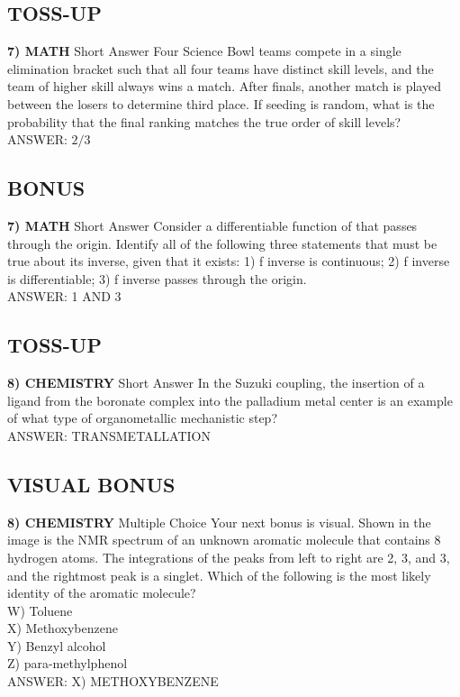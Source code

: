 \documentclass{article}
\begin{document}
\subsection*{TOSS-UP}
\textbf{7) MATH} Short Answer Four Science Bowl teams compete in a single elimination bracket such that all four teams have distinct skill levels, and the team of higher skill always wins a match. After finals, another match is played between the losers to determine third place. If seeding is random, what is the probability that the final ranking matches the true order of skill levels?
\\ANSWER: $2/3$

\subsection*{BONUS}
\textbf{7) MATH} Short Answer Consider a differentiable function of that passes through the origin. Identify all of the following three statements that must be true about its inverse, given that it exists: 1) f inverse is continuous; 2) f inverse is differentiable; 3) f inverse passes through the origin.
\\ANSWER: 1 AND 3

\subsection*{TOSS-UP}
\textbf{8) CHEMISTRY} Short Answer In the Suzuki coupling, the insertion of a ligand from the boronate complex into the palladium metal center is an example of what type of organometallic mechanistic step?
\\ANSWER: TRANSMETALLATION

\subsection*{VISUAL BONUS}
\textbf{8) CHEMISTRY} Multiple Choice Your next bonus is visual. Shown in the image is the NMR spectrum of an unknown aromatic molecule that contains 8 hydrogen atoms. The integrations of the peaks from left to right are 2, 3, and 3, and the rightmost peak is a singlet. Which of the following is the most likely identity of the aromatic molecule?
\\W) Toluene
\\X) Methoxybenzene
\\Y) Benzyl alcohol
\\Z) para-methylphenol
\\ANSWER: X) METHOXYBENZENE
\end{document}
